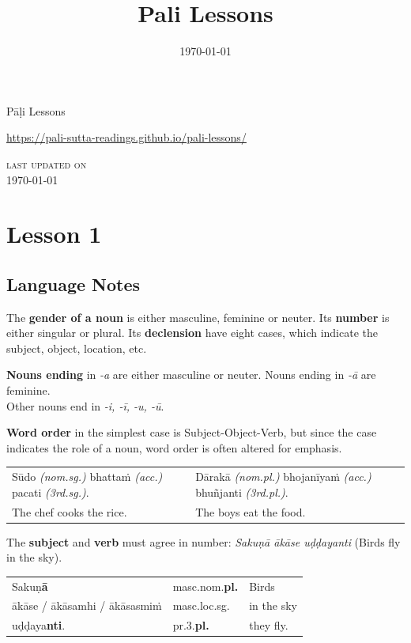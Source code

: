 \documentclass[11pt,oneside]{memoir}
\date{\today}
\title{Pali Lessons}
\begin{document}
\maketitle
\frontmatter

{\centering

{\Huge Pāḷi Lessons}

\bigskip
\href{https://pali-sutta-readings.github.io/pali-lessons/}{https://pali-sutta-readings.github.io/pali-lessons/}

{\scshape\small last updated on}\\
\today

}

\bigskip
\tableofcontents*

\mainmatter
\chapter{Lesson 1}
\label{sec:orgb7a0b05}
\section{Language Notes}
\label{sec:org41699d4}

The \textbf{gender of a noun} is either masculine, feminine or neuter.
Its \textbf{number} is either singular or plural.
Its \textbf{declension} have eight cases, which indicate the subject, object, location, etc.

\textbf{Nouns ending} in \emph{-a} are either masculine or neuter. Nouns ending in \emph{-ā} are feminine.\\
Other nouns end in \emph{-i, -ī, -u, -ū}.

\textbf{Word order} in the simplest case is Subject-Object-Verb, but since the case indicates the role of a noun, word order is often altered for emphasis.

\begin{center}
\begin{tabular}{ll}
Sūdo \emph{(nom.sg.)} bhattaṁ \emph{(acc.)} pacati \emph{(3rd.sg.)}. & Dārakā \emph{(nom.pl.)} bhojanīyaṁ \emph{(acc.)} bhuñjanti \emph{(3rd.pl.)}.\\
The chef cooks the rice. & The boys eat the food.\\
\end{tabular}
\end{center}

The \textbf{subject} and \textbf{verb} must agree in number: \emph{Sakuṇā ākāse uḍḍayanti} (Birds fly in the sky).

\begin{center}
\begin{tabular}{lll}
Sakuṇ\textbf{ā} & masc.nom.\textbf{pl.} & Birds\\
ākāse / ākāsamhi / ākāsasmiṁ & masc.loc.sg. & in the sky\\
uḍḍaya\textbf{nti}. & pr.3.\textbf{pl.} & they fly.\\
\end{tabular}
\end{center}
\end{document}
